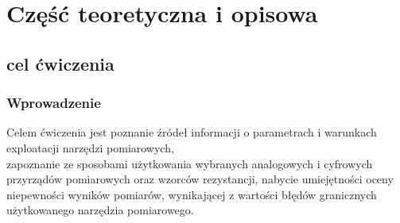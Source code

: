 \documentclass{article}  %
\begin{document}
\section{Część teoretyczna i opisowa}
\subsection{cel ćwiczenia}
\subsubsection{Wprowadzenie}
\begin{flushleft}
    Celem ćwiczenia jest poznanie źródeł informacji o parametrach i warunkach exploatacji narzędzi pomiarowych,\\
    zapoznanie ze sposobami użytkowania wybranych analogowych i cyfrowych przyrządów pomiarowych oraz wzorców rezystancji,
    nabycie umiejętności oceny niepewności wyników pomiarów, wynikającej z wartości błędów granicznych użytkowanego narzędzia pomiarowego.
\end{flushleft}
\end{document}
